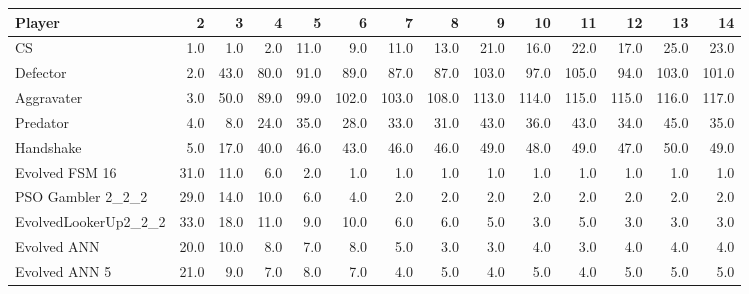 \begin{tabular}{lrrrrrrrrrrrrr}
\toprule
               Player &     2 &     3 &     4 &     5 &      6 &      7 &      8 &      9 &     10 &     11 &     12 &     13 &     14 \\
\midrule
                   CS &   1.0 &   1.0 &   2.0 &  11.0 &    9.0 &   11.0 &   13.0 &   21.0 &   16.0 &   22.0 &   17.0 &   25.0 &   23.0 \\
             Defector &   2.0 &  43.0 &  80.0 &  91.0 &   89.0 &   87.0 &   87.0 &  103.0 &   97.0 &  105.0 &   94.0 &  103.0 &  101.0 \\
           Aggravater &   3.0 &  50.0 &  89.0 &  99.0 &  102.0 &  103.0 &  108.0 &  113.0 &  114.0 &  115.0 &  115.0 &  116.0 &  117.0 \\
             Predator &   4.0 &   8.0 &  24.0 &  35.0 &   28.0 &   33.0 &   31.0 &   43.0 &   36.0 &   43.0 &   34.0 &   45.0 &   35.0 \\
            Handshake &   5.0 &  17.0 &  40.0 &  46.0 &   43.0 &   46.0 &   46.0 &   49.0 &   48.0 &   49.0 &   47.0 &   50.0 &   49.0 \\
       Evolved FSM 16 &  31.0 &  11.0 &   6.0 &   2.0 &    1.0 &    1.0 &    1.0 &    1.0 &    1.0 &    1.0 &    1.0 &    1.0 &    1.0 \\
    PSO Gambler 2\_2\_2 &  29.0 &  14.0 &  10.0 &   6.0 &    4.0 &    2.0 &    2.0 &    2.0 &    2.0 &    2.0 &    2.0 &    2.0 &    2.0 \\
 EvolvedLookerUp2\_2\_2 &  33.0 &  18.0 &  11.0 &   9.0 &   10.0 &    6.0 &    6.0 &    5.0 &    3.0 &    5.0 &    3.0 &    3.0 &    3.0 \\
          Evolved ANN &  20.0 &  10.0 &   8.0 &   7.0 &    8.0 &    5.0 &    3.0 &    3.0 &    4.0 &    3.0 &    4.0 &    4.0 &    4.0 \\
        Evolved ANN 5 &  21.0 &   9.0 &   7.0 &   8.0 &    7.0 &    4.0 &    5.0 &    4.0 &    5.0 &    4.0 &    5.0 &    5.0 &    5.0 \\
\bottomrule
\end{tabular}
